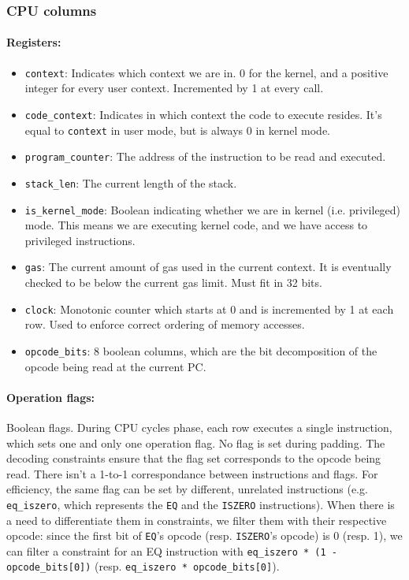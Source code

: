\subsubsection{CPU columns}

\paragraph*{Registers:} \begin{itemize}
    \item \texttt{context}: Indicates which context we are in. 0 for the kernel, and a positive integer for every user context. Incremented by 1 at every call.
    \item \texttt{code\_context}: Indicates in which context the code to execute resides. It's equal to \texttt{context} in user mode, but is always 0 in kernel mode.
    \item \texttt{program\_counter}: The address of the instruction to be read and executed.
    \item \texttt{stack\_len}: The current length of the stack.
    \item \texttt{is\_kernel\_mode}: Boolean indicating whether we are in kernel (i.e. privileged) mode. This means we are executing kernel code, and we have access to
privileged instructions.
    \item \texttt{gas}: The current amount of gas used in the current context. It is eventually checked to be below the current gas limit. Must fit in 32 bits.
    \item \texttt{clock}: Monotonic counter which starts at 0 and is incremented by 1 at each row. Used to enforce correct ordering of memory accesses. 
    \item \texttt{opcode\_bits}: 8 boolean columns, which are the bit decomposition of the opcode being read at the current PC.
\end{itemize}

\paragraph*{Operation flags:} Boolean flags. During CPU cycles phase, each row executes a single instruction, which sets one and only one operation flag. No flag is set during
padding. The decoding constraints ensure that the flag set corresponds to the opcode being read.
There isn't a 1-to-1 correspondance between instructions and flags. For efficiency, the same flag can be set by different, unrelated instructions (e.g. \texttt{eq\_iszero}, which represents
the \texttt{EQ} and the \texttt{ISZERO} instructions). When there is a need to differentiate them in constraints, we filter them with their respective opcode: since the first bit of \texttt{EQ}'s opcode
(resp. \texttt{ISZERO}'s opcode) is 0 (resp. 1), we can filter a constraint for an EQ instruction with \texttt{eq\_iszero * (1 - opcode\_bits[0])}
(resp. \texttt{eq\_iszero * opcode\_bits[0]}).

